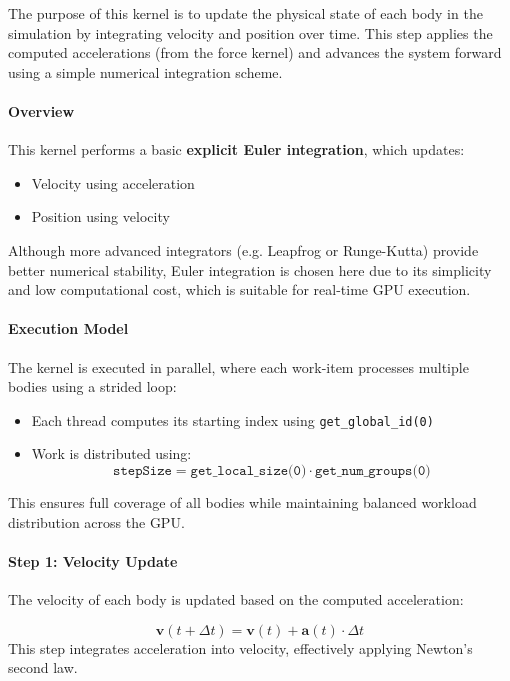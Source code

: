 \documentclass[12pt]{article}
\begin{document}
The purpose of this kernel is to update the physical state of each body in the simulation
by integrating velocity and position over time. This step applies the computed accelerations
(from the force kernel) and advances the system forward using a simple numerical integration scheme.

\paragraph{Overview}

This kernel performs a basic \textbf{explicit Euler integration}, which updates:

\begin{itemize}
    \item Velocity using acceleration
    \item Position using velocity
\end{itemize}

Although more advanced integrators (e.g. Leapfrog or Runge-Kutta) provide better numerical stability,
Euler integration is chosen here due to its simplicity and low computational cost, which is suitable
for real-time GPU execution.

\paragraph{Execution Model}

The kernel is executed in parallel, where each work-item processes multiple bodies using a strided loop:

\begin{itemize}
    \item Each thread computes its starting index using \texttt{get\_global\_id(0)}
    \item Work is distributed using:
    \[
    \texttt{stepSize} = \texttt{get\_local\_size(0)} \cdot \texttt{get\_num\_groups(0)}
    \]
\end{itemize}

This ensures full coverage of all bodies while maintaining balanced workload distribution across the GPU.

\paragraph{Step 1: Velocity Update}

The velocity of each body is updated based on the computed acceleration:

\[
\mathbf{v}(t + \Delta t) = \mathbf{v}(t) + \mathbf{a}(t) \cdot \Delta t
\]
This step integrates acceleration into velocity, effectively applying Newton's second law.
\end{document}
